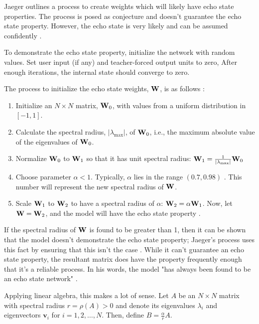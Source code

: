 \documentclass{article}
\begin{document}
Jaeger outlines a process to create weights which will likely have echo state
properties. The process is posed as conjecture and doesn't guarantee the echo
state property. However, the echo state is very likely and can be assumed
confidently \cite{jaeger2002tutorial} \cite{jaeger2007echo}.

To demonstrate the echo state property, initialize the network with random
values. Set user input (if any) and teacher-forced output units to zero,
After enough iterations, the internal state should converge to zero.

The process to initialize the echo state weights, $\mathbf{W}$, is as follows
\cite{jaeger2002tutorial}:

\newcommand{\specrad}{\vert \lambda_\text{max} \vert}
\begin{enumerate}
    \item Initialize an $N \times N$ matrix, $\mathbf{W}_0$, with values from a 
    uniform distribution in $[-1, 1]$.
    \item Calculate the spectral radius, $\specrad$, of $\mathbf{W}_0$, i.e., the 
    maximum absolute value of the eigenvalues of $\mathbf{W}_0$.
    \item Normalize $\mathbf{W}_0$ to $\mathbf{W}_1$ so that it has unit spectral radius:
    $\W_1 = \frac{1}{\specrad} \W_0$
    \item Choose parameter $\alpha < 1$. Typically, $\alpha$ lies in
    the range $(0.7, 0.98)$ \cite{jaeger2002tutorial}. This number will 
    represent the new spectral radius of $\mathbf{W}$.
    \item Scale $\mathbf{W}_1$ to $\mathbf{W}_2$ to have a spectral radius of
    $\alpha$: $\mathbf{W}_2 = \alpha \mathbf{W}_1$. Now, let $\mathbf{W} = \mathbf{W}_2$, and the model
    will have the echo state property \cite{jaeger2002tutorial}.
\end{enumerate}

If the spectral radius of $\mathbf{W}$ is found to be greater than 1, then it can be
shown that the model doesn't demonstrate the echo state property; Jaeger's
process uses this fact by ensuring that this isn't the case
\cite{jaeger2002tutorial}. While it can't guarantee an echo state property,
the resultant matrix does have the property frequently enough that it's a
reliable process. In his words, the model "has always been found to be an
echo state network" \cite{jaeger2002tutorial}.

\newcommand{\vv}{\mathbf{v}}

Applying linear algebra, this makes a lot of sense. Let $A$ be an $N \times
N$ matrix with spectral radius $r = \rho(A) > 0$ and denote its eigenvalues
$\lambda_i$ and eigenvectors $\vv_i$ for $i = 1, 2, \dots, N$. Then, define
$B = \frac{\alpha}{r} A$.
\end{document}

